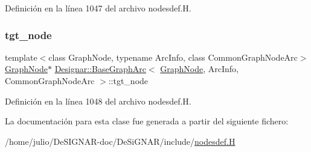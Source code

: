 Definición en la línea 1047 del archivo nodesdef.\+H.

\mbox{\label{class_designar_1_1_base_graph_arc_af09ee39743d9a2e6f7bad479d925c273}} 
\subsubsection{\texorpdfstring{tgt\+\_\+node}{tgt\_node}}
{\footnotesize\ttfamily template$<$class Graph\+Node, typename Arc\+Info, class Common\+Graph\+Node\+Arc$>$ \\
\hyperlink{class_designar_1_1_graph_node}{Graph\+Node}$\ast$ \hyperlink{class_designar_1_1_base_graph_arc}{Designar\+::\+Base\+Graph\+Arc}$<$ \hyperlink{class_designar_1_1_graph_node}{Graph\+Node}, Arc\+Info, Common\+Graph\+Node\+Arc $>$\+::tgt\+\_\+node\hspace{0.3cm}{\ttfamily [protected]}}



Definición en la línea 1048 del archivo nodesdef.\+H.



La documentación para esta clase fue generada a partir del siguiente fichero\+:\begin{DoxyCompactItemize}
\item 
/home/julio/\+De\+S\+I\+G\+N\+A\+R-\/doc/\+De\+Si\+G\+N\+A\+R/include/\hyperlink{nodesdef_8_h}{nodesdef.\+H}\end{DoxyCompactItemize}

